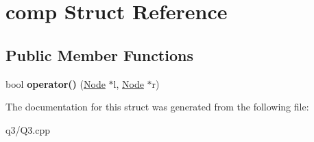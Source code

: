 \hypertarget{structcomp}{}\section{comp Struct Reference}
\label{structcomp}
\subsection*{Public Member Functions}
\begin{DoxyCompactItemize}
\item 
\mbox{\label{structcomp_a4d694fdd4e34d2efdd74d9177136ff10}} 
bool {\bfseries operator()} (\hyperlink{struct_node}{Node} $\ast$l, \hyperlink{struct_node}{Node} $\ast$r)
\end{DoxyCompactItemize}


The documentation for this struct was generated from the following file\+:\begin{DoxyCompactItemize}
\item 
q3/Q3.\+cpp\end{DoxyCompactItemize}
